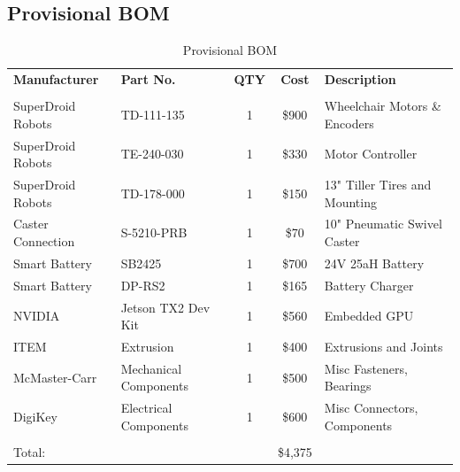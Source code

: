 \documentclass[12pt]{extarticle}
\begin{document}
\subsection{Provisional BOM}
\begin{table}[H]
\centering
\def\arraystretch{1.1}
\caption{Provisional BOM}
\label{Tab:provisional_bom}
\begin{tabular}{ llccl }
\hline
    \textbf{Manufacturer} & \textbf{Part No.} & \textbf{QTY} & \textbf{Cost} & \textbf{Description}\\
    \\[-.8ex]
    SuperDroid Robots & TD-111-135 & 1 & \$900 & Wheelchair Motors \& Encoders \\
	SuperDroid Robots & TE-240-030 & 1 & \$330 & Motor Controller \\
	SuperDroid Robots & TD-178-000 & 1 & \$150 & 13" Tiller Tires and Mounting \\
	Caster Connection & S-5210-PRB & 1 & \$70 & 10" Pneumatic Swivel Caster \\
	Smart Battery & SB2425 & 1 & \$700 & 24V 25aH Battery \\
    Smart Battery & DP-RS2 & 1 & \$165 & Battery Charger \\
    NVIDIA & Jetson TX2 Dev Kit & 1 & \$560 &  Embedded GPU \\
	ITEM & Extrusion & 1 & \$400 & Extrusions and Joints \\
	McMaster-Carr & Mechanical Components & 1 & \$500 & Misc Fasteners, Bearings \\
	DigiKey & Electrical Components & 1 & \$600 & Misc Connectors, Components \\[.5ex]
	\hline 
	\\[-2ex]
	Total: &&& \$4,375 &\\
	
    
\end{tabular}
\end{table}
\end{document}
